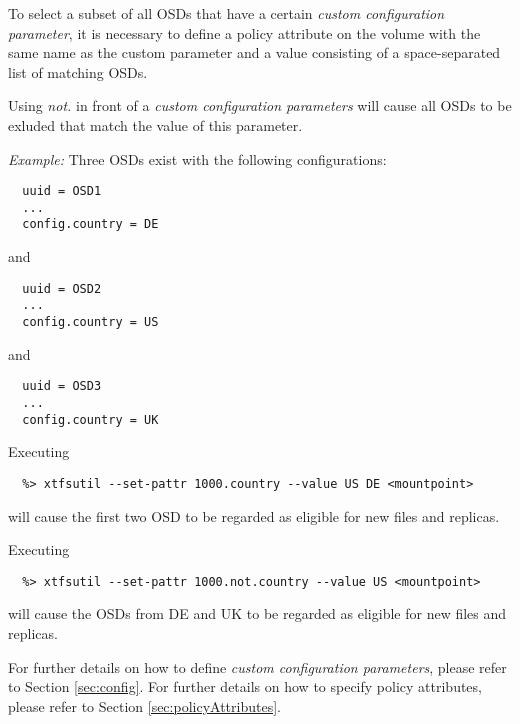 \documentclass[a4paper,10pt]{book}
\begin{document}
To select a subset of all OSDs that have a certain \emph{custom configuration parameter}, it is necessary to define a policy attribute on the volume with the same name as the custom parameter and a value consisting of a space-separated list of matching OSDs.

Using \emph{not.} in front of a \emph{custom configuration parameters} will cause all OSDs to be exluded that match the value of this parameter.

\vspace{0.5cm}
\emph{Example:} Three OSDs exist with the following configurations:

  \begin{verbatim}
  uuid = OSD1
  ...
  config.country = DE\end{verbatim}

and

  \begin{verbatim}
  uuid = OSD2
  ...
  config.country = US\end{verbatim}

and

  \begin{verbatim}
  uuid = OSD3
  ...
  config.country = UK\end{verbatim}

Executing

  \begin{verbatim}
  %> xtfsutil --set-pattr 1000.country --value US DE <mountpoint>
  \end{verbatim}

will cause the first two OSD to be regarded as eligible for new files and replicas.

\vspace{0.5cm}

Executing

  \begin{verbatim}
  %> xtfsutil --set-pattr 1000.not.country --value US <mountpoint>
  \end{verbatim}

will cause the OSDs from DE and UK to be regarded as eligible for new files and replicas.

\vspace{0.5cm}

For further details on how to define \emph{custom configuration parameters}, please refer to Section \ref{sec:config}. For further details on how to specify policy attributes, please refer to Section \ref{sec:policyAttributes}.
\end{document}
